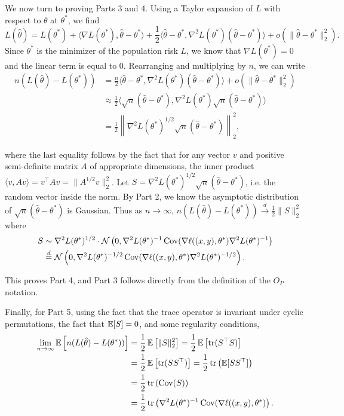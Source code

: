 We now turn to proving Parts 3 and 4. Using a Taylor expansion of $L$ with respect to $\theta$ at $\theta^*$, we find
\begin{equation}
L(\hat \theta) = L(\theta^*) 
+ \langle \nabla L(\theta^*), \hat \theta - \theta^* \rangle 
+ \frac12 \langle \hat \theta - \theta^*, \nabla^2 L(\theta^*) (\hat \theta - \theta^*) \rangle + o(\|\hat \theta - \theta^*\|_2^2).
\end{equation}
Since $\theta^*$ is the minimizer of the population risk $L$, we know that $\nabla L(\theta^*) = 0$ and the linear term is equal to 0. Rearranging and multiplying by $n$, we can write
\begin{align}
n (L(\hat \theta) - L(\theta^*)) &= \frac{n}{2} \langle \hat \theta - \theta^*, \nabla^2 L(\theta^*) (\hat \theta - \theta^*) \rangle + o(\|\hat \theta - \theta^*\|_2^2) \\
&\approx \frac12 \langle \sqrt n(\hat \theta - \theta^*), \nabla^2 L(\theta^*) \sqrt n (\hat \theta - \theta^*) \rangle \\
&= \frac12 \left\|\nabla^2 L(\theta^*)^{1/2} \sqrt n(\hat \theta - \theta^*) \right\|_2^2,
\end{align}

where the last equality follows by the fact that for any vector $v$ and positive semi-definite matrix $A$ of appropriate dimensions, the inner product $\langle v, Av\rangle = v^\top Av = \lVert A^{1/2}v \rVert_2^2$. Let $S = \nabla^2 L(\theta^*)^{1/2} \sqrt n(\hat \theta - \theta^*)$, i.e. the random vector inside the norm. By Part 2, we know the asymptotic distribution of $\sqrt n(\hat \theta - \theta^*)$ is Gaussian. Thus as $n \to \infty$, $n (L(\hat \theta) - L(\theta^*)) \overset d \to \frac12 \|S\|_2^2$ where
\begin{align}
    S &\sim \nabla^2 L(\theta^*)^{1/2} \cdot \mathcal N \left(0, \nabla^2 L(\theta^*)^{-1} \operatorname{Cov}(\nabla \ell ((x, y), \theta^*) \nabla^2 L(\theta^*)^{-1} \right) \\
    &\stackrel{d}{=} \mathcal N \left(0, \nabla^2 L(\theta^*)^{-1/2} \operatorname{Cov}(\nabla \ell ((x, y), \theta^*) \nabla^2 L(\theta^*)^{-1/2} \right).
\end{align}

This proves Part 4, and Part 3 follows directly from the definition of the $O_P$ notation.

Finally, for Part 5, using the fact that the trace operator is invariant under cyclic permutations, the fact that $\operatorname*{\mathbb{E}} [S] = 0$, and some regularity conditions,
\begin{align}
    \lim_{n \to \infty} \operatorname*{\mathbb{E}} \left[ n (L(\hat \theta) - L(\theta^*)) \right] &= \frac12 \operatorname*{\mathbb{E}}\left[ \|S\|_2^2 \right] = \frac12 \operatorname*{\mathbb{E}} \left[ \operatorname{tr}(S^\top S) \right] \\
    &= \frac12 \operatorname*{\mathbb{E}} \left[ \operatorname{tr}(S S^\top) \right]  = \frac12 \operatorname{tr} \left(\operatorname*{\mathbb{E}}[S S^\top] \right) \\
    &= \frac12 \operatorname{tr} \left( \operatorname{Cov}(S) \right) \\
    &= \frac12 \operatorname{tr}\left( \nabla^2 L(\theta^*)^{-1} \operatorname{Cov}(\nabla \ell ((x, y), \theta^*) \right).
\end{align}

